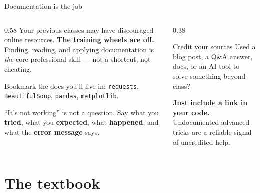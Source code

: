 \documentclass[9pt,aspectratio=169]{beamer}
\begin{document}
\begin{frame}{Documentation is the job}
    \begin{columns}[T]
        \begin{column}{0.58\textwidth}
            Your previous classes may have discouraged online resources. \textbf{The training wheels are off.} Finding, reading, and applying documentation is \textit{the} core professional skill --- not a shortcut, not cheating.

            \vspace{0.75em}

            Bookmark the docs you'll live in: \texttt{requests}, \texttt{BeautifulSoup}, \texttt{pandas}, \texttt{matplotlib}.

            \vspace{0.75em}

            ``It's not working'' is not a question. Say what you \textbf{tried}, what you \textbf{expected}, what \textbf{happened}, and what the \textbf{error message} says.
        \end{column}
        \begin{column}{0.38\textwidth}
            \begin{block}{Credit your sources}
                \footnotesize Used a blog post, a Q\&A answer, docs, or an AI tool to solve something beyond class?
                \vspace{0.3em}

                \textbf{Just include a link in your code.} Undocumented advanced tricks are a reliable signal of uncredited help.
            \end{block}
        \end{column}
    \end{columns}
\end{frame}

\section{The textbook}
\end{document}
